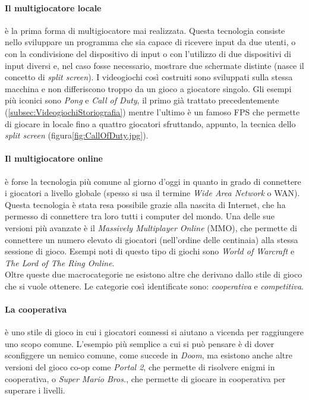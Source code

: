         \paragraph{Il multigiocatore locale} è la prima forma di multigiocatore mai realizzata. Questa tecnologia consiste nello sviluppare un programma che sia
            capace di ricevere input da due utenti, o con la condivisione del dispositivo di input o con l'utilizzo di due dispositivi di input diversi e, nel caso
            fosse necessario, mostrare due schermate distinte (nasce il concetto di \textit{split screen}). I videogiochi così costruiti sono sviluppati sulla stessa macchina 
            e non differiscono troppo da un gioco a giocatore singolo\cite{glazer2015}. Gli esempi più iconici sono \textit{Pong} e \textit{Call of Duty}, il primo già trattato precedentemente (\ref{subsec:VideogiochiStoriografia})
            mentre l'ultimo è un famoso FPS che permette di giocare in locale fino a quattro giocatori sfruttando, appunto, la tecnica dello \textit{split screen} 
            (figura\ref{fig:CallOfDuty.jpg}). 

        \paragraph{Il multigiocatore online} è forse la tecnologia più comune al giorno d'oggi in quanto in grado di connettere i giocatori a livello globale (spesso si usa il termine
            \textit{Wide Area Network} o WAN). Questa tecnologia è stata resa possibile grazie alla nascita di Internet, che ha permesso di connettere tra loro tutti i computer del 
            mondo. Una delle sue versioni più avanzate è il \textit{Massively Multiplayer Online} (MMO), che permette di connettere un numero elevato di giocatori (nell'ordine delle
            centinaia) alla stessa sessione di gioco. Esempi noti di questo tipo di giochi sono \textit{World of Warcraft} e \textit{The Lord of The Ring Online}.\\

        Oltre queste due macrocategorie ne esistono altre che derivano dallo stile di gioco che si vuole ottenere. Le categorie così identificate sono: \textit{cooperativa} e
        \textit{competitiva}.

        \paragraph{La cooperativa} è uno stile di gioco in cui i giocatori connessi si aiutano a vicenda per raggiungere uno scopo comune. L'esempio più semplice a cui si può pensare
            è di dover sconfiggere un nemico comune, come succede in \textit{Doom}, ma esistono anche altre versioni del gioco co-op come \textit{Portal 2}, che permette di
            risolvere enigmi in cooperativa, o \textit{Super Mario Bros.}, che permette di giocare in cooperativa per superare i livelli.\\
        
